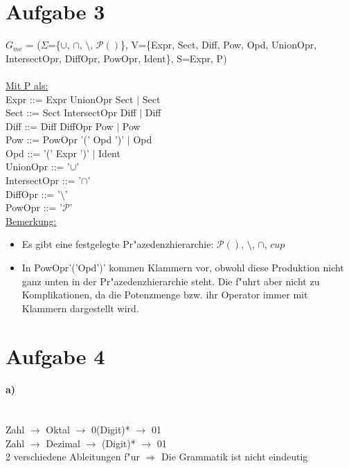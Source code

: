 \documentclass[12pt]{article}
\begin{document}
\section*{Aufgabe 3}
$G_{me}$ = ($\Sigma$=\{$\cup$, $\cap$, $\setminus$, $\mathcal{P}()$\}, V=\{Expr, Sect, Diff, Pow, Opd, UnionOpr, IntersectOpr, DiffOpr, PowOpr, Ident\}, S=Expr, P)\\
\ \\
\noindent \underline{Mit P als:}\\
Expr ::= Expr UnionOpr Sect $|$ Sect\\
Sect ::= Sect IntersectOpr Diff $|$ Diff\\
Diff ::= Diff DiffOpr Pow $|$ Pow\\
Pow ::= PowOpr '(' Opd ')' $|$ Opd\\
Opd ::= '(' Expr ')' $|$ Ident\\
UnionOpr ::= '$\cup$'\\
IntersectOpr ::= '$\cap$'\\
DiffOpr ::= '$\setminus$'\\
PowOpr ::= '$\mathcal{P}$'\\

\noindent \underline{Bemerkung:}
\begin{itemize}
\item Es gibt eine festgelegte Pr"azedenzhierarchie: $\mathcal{P}()$, $\setminus$, $\cap$, $cup$
\item In PowOpr'('Opd')' kommen Klammern vor, obwohl diese Produktion nicht ganz unten in der Pr"azedenzhierarchie steht. Die f"uhrt aber nicht zu Komplikationen, da die Potenzmenge bzw. ihr Operator immer mit Klammern dargestellt wird. 
\end{itemize}



\section*{Aufgabe 4}
\paragraph{a)}\ \\
	Zahl $\rightarrow$ Oktal $\rightarrow$ 0(Digit)* $\rightarrow$ 01 \\
	Zahl $\rightarrow$ Dezimal $\rightarrow$ (Digit)* $\rightarrow$ 01 \\
	2 verschiedene Ableitungen f"ur \dq $\Rightarrow$ Die Grammatik ist nicht eindeutig
	
\end{document}
